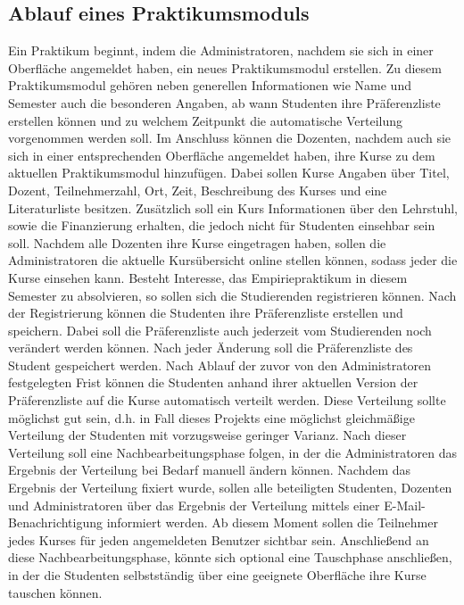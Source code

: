 		\subsection{Ablauf eines Praktikumsmoduls}
			Ein Praktikum beginnt, indem die Administratoren, nachdem sie sich in einer Oberfläche angemeldet haben, ein neues Praktikumsmodul erstellen.
			Zu diesem Praktikumsmodul gehören neben generellen Informationen wie Name und Semester auch die besonderen Angaben, ab wann Studenten ihre Präferenzliste erstellen können und zu welchem Zeitpunkt die automatische Verteilung vorgenommen werden soll.
			Im Anschluss können die Dozenten, nachdem auch sie sich in einer entsprechenden Oberfläche angemeldet haben, ihre Kurse zu dem aktuellen Praktikumsmodul hinzufügen.
			Dabei sollen Kurse Angaben über Titel, Dozent, Teilnehmerzahl, Ort, Zeit, Beschreibung des Kurses und eine Literaturliste besitzen.
			Zusätzlich soll ein Kurs Informationen über den Lehrstuhl, sowie die Finanzierung erhalten, die jedoch nicht für Studenten einsehbar sein soll.
			Nachdem alle Dozenten ihre Kurse eingetragen haben, sollen die Administratoren die aktuelle Kursübersicht online stellen können, sodass jeder die Kurse einsehen kann.
			Besteht Interesse, das Empiriepraktikum in diesem Semester zu absolvieren, so sollen sich die Studierenden registrieren können.
			Nach der Registrierung können die Studenten ihre Präferenzliste erstellen und speichern.
			Dabei soll die Präferenzliste auch jederzeit vom Studierenden noch verändert werden können.
			Nach jeder Änderung soll die Präferenzliste des Student gespeichert werden.
			Nach Ablauf der zuvor von den Administratoren festgelegten Frist können die Studenten anhand ihrer aktuellen Version der Präferenzliste auf die Kurse automatisch verteilt werden.
			Diese Verteilung sollte möglichst gut sein, d.h. in Fall dieses Projekts eine möglichst gleichmäßige Verteilung der Studenten mit vorzugsweise geringer Varianz.
			Nach dieser Verteilung soll eine Nachbearbeitungsphase folgen, in der die Administratoren das Ergebnis der Verteilung bei Bedarf manuell ändern können.
			Nachdem das Ergebnis der Verteilung fixiert wurde, sollen alle beteiligten Studenten, Dozenten und Administratoren über das Ergebnis der Verteilung mittels einer E-Mail-Benachrichtigung informiert werden.
			Ab diesem Moment sollen die Teilnehmer jedes Kurses für jeden angemeldeten Benutzer sichtbar sein.
			Anschließend an diese Nachbearbeitungsphase, könnte sich optional eine Tauschphase anschließen, in der die Studenten selbstständig über eine geeignete Oberfläche ihre Kurse tauschen können.
			
